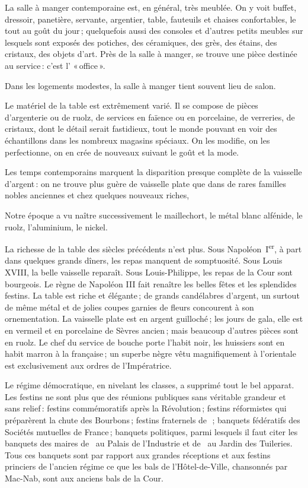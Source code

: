 {La salle à manger contemporaine est, en général, très meublée. On y voit
buffet, dressoir, panetière, servante, argentier, table, fauteuils et chaises
confortables, le tout au goût du jour ; quelquefois aussi des consoles et
d'autres petits meubles sur lesquels sont exposés des potiches, des céramiques,
des grès, des étains, des cristaux, des objets d'art. Près de la salle
à manger, se trouve une pièce destinée au service : c'est l' « office ».

Dans les logements modestes, la salle à manger tient souvent lieu de salon.

Le matériel de la table est extrêmement varié. Il se compose de pièces
d'argenterie ou de ruolz, de services en faïence ou en porcelaine, de
verreries, de cristaux, dont le détail serait fastidieux, tout le monde pouvant
en voir des échantillons dans les nombreux magasins spéciaux. On les modifie,
on les perfectionne, on en crée de nouveaux suivant le goût et la mode.

Les temps contemporains marquent la disparition presque complète de la
vaisselle d'argent : on ne trouve plus guère de vaisselle plate que dans de
rares familles nobles anciennes et chez quelques nouveaux riches,

Notre époque a vu naître successivement le maillechort, le métal blanc
alfénide, le ruolz, l'aluminium, le nickel.

La richesse de la table des siècles précédents n'est plus. Sous
Napoléon I\textsuperscript{er}, à part dans quelques grands dîners, les repas
manquent de somptuosité. Sous Louis XVIII, la belle vaisselle reparaît. Sous
Louis-Philippe, les repas de la Cour sont bourgeois. Le règne de Napoléon III
fait renaître les belles fêtes et les splendides festins. La table est riche et
élégante ; de grands candélabres d'argent, un surtout de même métal et de
jolies coupes garnies de fleurs concourent à son ornementation. La vaisselle
plate est en argent guilloché ; les jours de gala, elle est en vermeil et en
porcelaine de Sèvres ancien ; mais beaucoup d'autres pièces sont en ruolz. Le
chef du service de bouche porte l'habit noir, les huissiers sont en habit
marron à la française ; un superbe nègre vêtu magnifiquement à l'orientale est
exclusivement aux ordres de l'Impératrice.

Le régime démocratique, en nivelant les classes, a supprimé tout le bel
apparat. Les festins ne sont plus que des réunions publiques sans véritable
grandeur et sans relief : festins commémoratifs après la Révolution ; festins
réformistes qui préparèrent la chute des Bourbons ; festins fraternels de
{\mmm} {\mmm} ; banquets fédératifs des Sociétés mutuelles de
France ; banquets politiques, parmi lesquels il faut citer les banquets des
maires de {\mmm} {\mmm} au Palais de l'Industrie et de
{\mmm} {\mmm} au Jardin des Tuileries. Tous ces banquets sont par
rapport aux grandes réceptions et aux festins princiers de l’ancien régime ce
que les bals de l'Hôtel-de-Ville, chansonnés par Mac-Nab, sont aux anciens bals
de la Cour.

}
